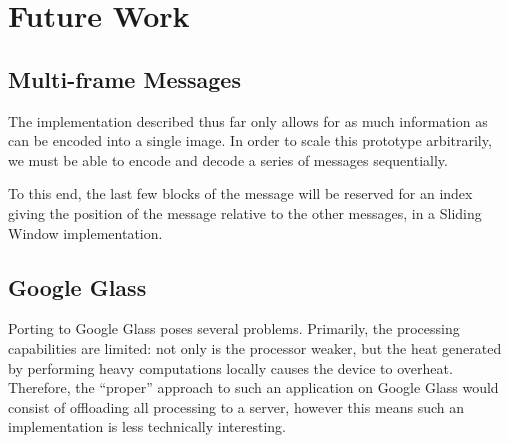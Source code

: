 \documentclass[11pt, letterpaper]{article}
\begin{document}
\section{Future Work}

\subsection{Multi-frame Messages}
The implementation described thus far only allows for as much information as can be encoded into a single image.
In order to scale this prototype arbitrarily, we must be able to encode and decode a series of messages sequentially.

To this end, the last few blocks of the message will be reserved for an index giving the position of the message relative to the other messages, in a Sliding Window implementation.

\subsection{Google Glass}
Porting to Google Glass poses several problems. Primarily, the processing capabilities are limited: not only is the processor weaker, but the heat generated by performing heavy computations locally causes the device to overheat.
Therefore, the ``proper'' approach to such an application on Google Glass would consist of offloading all processing to a server, however this means such an implementation is less technically interesting.

\printbibliography
\end{document}
